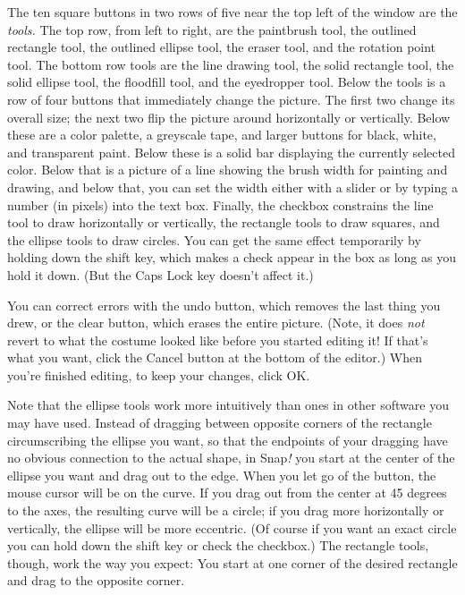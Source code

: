 The ten square buttons in two rows of five near the top left of the
window are the \emph{tools.} The top row, from left to right, are the
paintbrush tool, the outlined rectangle tool, the outlined ellipse tool,
the eraser tool, and the rotation point tool. The bottom row tools are
the line drawing tool, the solid rectangle tool, the solid ellipse tool,
the floodfill tool, and the eyedropper tool. Below the tools is a row of
four buttons that immediately change the picture. The first two change
its overall size; the next two flip the picture around horizontally or
vertically. Below these are a color palette, a greyscale tape, and
larger buttons for black, white, and transparent paint. Below these is a
solid bar displaying the currently selected color. Below that is a
picture of a line showing the brush width for painting and drawing, and
below that, you can set the width either with a slider or by typing a
number (in pixels) into the text box. Finally, the checkbox constrains
the line tool to draw horizontally or vertically, the rectangle tools to
draw squares, and the ellipse tools to draw circles. You can get the
same effect temporarily by holding down the shift key, which makes a
check appear in the box as long as you hold it down. (But the Caps Lock
key doesn't affect it.)

You can correct errors with the undo button, which removes the last
thing you drew, or the clear button, which erases the entire picture.
(Note, it does \emph{not} revert to what the costume looked like before
you started editing it! If that's what you want, click the Cancel button
at the bottom of the editor.) When you're finished editing, to keep your
changes, click OK.

Note that the ellipse tools work more intuitively than ones in other
software you may have used. Instead of dragging between opposite corners
of the rectangle circumscribing the ellipse you want, so that the
endpoints of your dragging have no obvious connection to the actual
shape, in Snap\emph{!} you start at the center of the ellipse you want
and drag out to the edge. When you let go of the button, the mouse
cursor will be on the curve. If you drag out from the center at 45
degrees to the axes, the resulting curve will be a circle; if you drag
more horizontally or vertically, the ellipse will be more eccentric. (Of
course if you want an exact circle you can hold down the shift key or
check the checkbox.) The rectangle tools, though, work the way you
expect: You start at one corner of the desired rectangle and drag to the
opposite corner.

